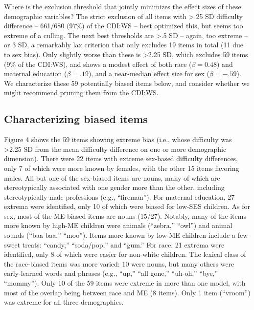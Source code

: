 \documentclass[10pt, letterpaper]{article}
\begin{document}
Where is the exclusion threshold that jointly minimizes the effect sizes
of these demographic variables? The strict exclusion of all items with
\textgreater.25 SD difficulty difference -- 661/680 (97\%) of the CDI:WS
-- best optimized this, but seems too extreme of a culling. The next
best thresholds are \textgreater.5 SD -- again, too extreme -- or 3 SD,
a remarkably lax criterion that only excludes 19 items in total (11 due
to sex bias). Only slightly worse than these is \textgreater2.25 SD,
which excludes 59 items (9\% of the CDI:WS), and shows a modest effect
of both race (\(\beta=0.48\)) and maternal education (\(\beta=.19\)),
and a near-median effect size for sex (\(\beta=-.59\)). We characterize
these 59 potentially biased items below, and consider whether we might
recommend pruning them from the CDI:WS.

\hypertarget{characterizing-biased-items}{%
\subsection{Characterizing biased
items}\label{characterizing-biased-items}}

Figure 4 shows the 59 items showing extreme bias (i.e., whose difficulty
was \textgreater2.25 SD from the mean difficulty difference on one or
more demographic dimension). There were 22 items with extreme sex-based
difficulty differences, only 7 of which were more known by females, with
the other 15 items favoring males. All but one of the sex-biased items
are nouns, many of which are stereotypically associated with one gender
more than the other, including stereotypically-male professions (e.g.,
``fireman''). For maternal education, 27 extrema were identified, only
10 of which were biased for low-SES children. As for sex, most of the
ME-biased items are nouns (15/27). Notably, many of the items more known
by high-ME children were animals (``zebra,'' ``owl'') and animal sounds
(``baa baa,'' ``moo''). Items more known by low-ME children include a
few sweet treats: ``candy,'' ``soda/pop,'' and ``gum.'' For race, 21
extrema were identified, only 8 of which were easier for non-white
children. The lexical class of the race-biased items was more varied: 10
were nouns, but many others were early-learned words and phrases (e.g.,
``up,'' ``all gone,'' ``uh-oh,'' ``bye,'' ``mommy''). Only 10 of the 59
items were extreme in more than one model, with most of the overlap
being between race and ME (8 items). Only 1 item (``vroom'') was extreme
for all three demographics.
\end{document}
